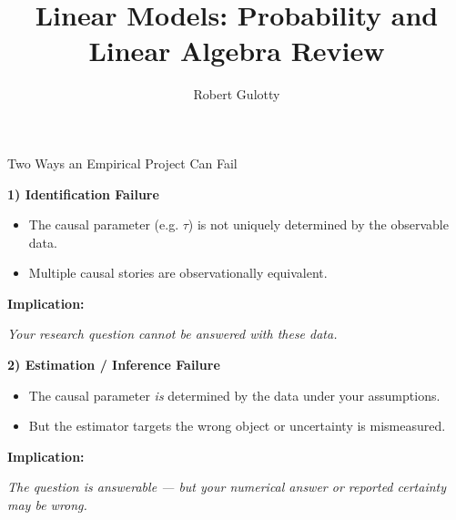 \documentclass[aspectratio=169, handout, t]{beamer}
\title[PLSC 30700]{Linear Models: Probability and Linear Algebra Review}
\author{Robert Gulotty}
\institute[Chicago]{University of Chicago}
\numberwithin{equation}{section}
\begin{document}
\begin{frame}
\maketitle
\end{frame}

\begin{frame}{Two Ways an Empirical Project Can Fail}

\vspace{0.2cm}

\textbf{1) Identification Failure}

\begin{itemize}
    \item The causal parameter (e.g. $\tau$) is not uniquely determined by the observable data.
    \item Multiple causal stories are observationally equivalent.
\end{itemize}

\vspace{0.2cm}

\textbf{Implication:}
\begin{center}
\emph{Your research question cannot be answered with these data.}
\end{center}

\vspace{0.5cm}

\textbf{2) Estimation / Inference Failure}

\begin{itemize}
    \item The causal parameter \emph{is} determined by the data under your assumptions.
    \item But the estimator targets the wrong object or uncertainty is mismeasured.
\end{itemize}

\vspace{0.2cm}

\textbf{Implication:}
\begin{center}
\emph{The question is answerable — but your numerical answer or reported certainty may be wrong.}
\end{center}

\end{frame}
\end{document}
